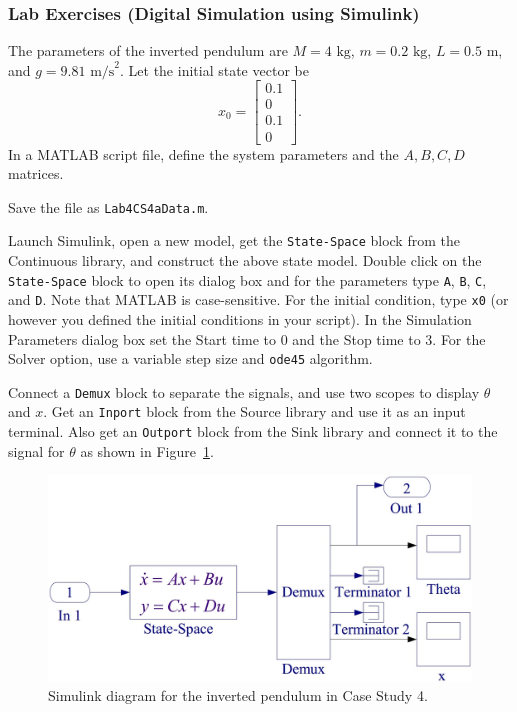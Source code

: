 \subsubsection{Lab Exercises (Digital Simulation using Simulink)}
The parameters of the inverted pendulum are $M=4\mbox{ kg}$, $m=0.2\mbox{ kg}$, $L = 0.5\mbox{ m}$, and $g = 9.81\mbox{ m/s}^2$.  Let the initial state vector be
\begin{equation}
    x_0 = \left[\begin{array}{c}
        0.1\\0\\0.1\\0
        \end{array}\right].
\end{equation}
In a MATLAB script file, define the system parameters and the $A,B,C,D$ matrices.
\par
Save the file as \texttt{Lab4CS4aData.m}.
\par
Launch Simulink, open a new model, get the \texttt{State-Space} block from the Continuous library, and construct the above state model.  Double click on the \texttt{State-Space} block to open its dialog box and for the parameters type \texttt{A}, \texttt{B}, \texttt{C}, and \texttt{D}.  Note that MATLAB is case-sensitive.  For the initial condition, type \texttt{x0} (or however you defined the initial conditions in your script).  In the Simulation Parameters dialog box set the Start time to 0 and the Stop time to 3.  For the Solver option, use a variable step size and \texttt{ode45} algorithm.
\par
Connect a \texttt{Demux} block to separate the signals, and use two scopes to display $\theta$ and $x$.  Get an \texttt{Inport} block from the Source library and use it as an input terminal.  Also get an \texttt{Outport} block from the Sink library and connect it to the signal for $\theta$ as shown in Figure~\ref{fig.invpendsimulink}.

\begin{figure}[bht]
\centering
\includegraphics[width=.6\textwidth]{InvPendSimulink}
\caption{\footnotesize
        Simulink diagram for the inverted pendulum in Case Study 4.
        \label{fig.invpendsimulink}
        }
\end{figure}


